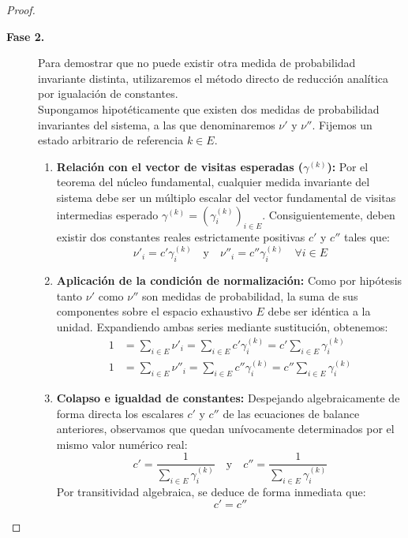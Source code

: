 \documentclass[10pt]{book}
\newcommand{\tbf}{\textbf}
\begin{document}
\begin{coro}
\begin{proof}
\begin{description}
    \item[\tbf{Fase 2.}] Para demostrar que no puede existir otra medida de probabilidad invariante distinta, utilizaremos el método directo de reducción analítica por igualación de constantes. \\

    \noindent
    Supongamos hipotéticamente que existen dos medidas de probabilidad invariantes del sistema, a las que denominaremos $\nu'$ y $\nu''$. Fijemos un estado arbitrario de referencia $k \in E$.

    \begin{enumerate}
        \item \textbf{Relación con el vector de visitas esperadas ($\gamma^{(k)}$):}
        Por el teorema del núcleo fundamental, cualquier medida invariante del sistema debe ser un múltiplo escalar del vector fundamental de visitas intermedias esperado $\gamma^{(k)} = (\gamma_i^{(k)})_{i \in E}$. Consiguientemente, deben existir dos constantes reales estrictamente positivas $c'$ y $c''$ tales que:
        \[
        \nu'_i = c' \gamma_i^{(k)} \quad \text{y} \quad \nu''_i = c'' \gamma_i^{(k)} \quad \forall i \in E
        \]
        
        \item \textbf{Aplicación de la condición de normalización:}
        Como por hipótesis tanto $\nu'$ como $\nu''$ son medidas de probabilidad, la suma de sus componentes sobre el espacio exhaustivo $E$ debe ser idéntica a la unidad. Expandiendo ambas series mediante sustitución, obtenemos:
        \begin{align*}
            1 &= \sum_{i \in E} \nu'_i = \sum_{i \in E} c' \gamma_i^{(k)} = c' \sum_{i \in E} \gamma_i^{(k)} \\
            1 &= \sum_{i \in E} \nu''_i = \sum_{i \in E} c'' \gamma_i^{(k)} = c'' \sum_{i \in E} \gamma_i^{(k)}
        \end{align*}
        
        \item \textbf{Colapso e igualdad de constantes:}
        Despejando algebraicamente de forma directa los escalares $c'$ y $c''$ de las ecuaciones de balance anteriores, observamos que quedan unívocamente determinados por el mismo valor numérico real:
        \[
        c' = \frac{1}{\sum_{i \in E} \gamma_i^{(k)}} \quad \text{y} \quad c'' = \frac{1}{\sum_{i \in E} \gamma_i^{(k)}}
        \]
        Por transitividad algebraica, se deduce de forma inmediata que:
        \[
        c' = c''
        \]
        

\end{enumerate}
\end{description}
\end{proof}
\end{coro}
\end{document}
